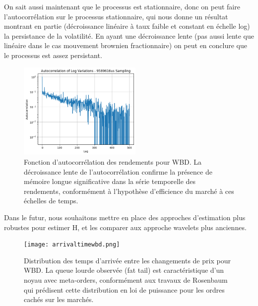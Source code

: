 \documentclass[10pt,a4paper]{article}
\theoremstyle{definition}
\theoremstyle{remark}
\begin{document}
\begin{itemize}
On sait aussi maintenant que le processus est stationnaire, donc on peut faire l'autocorrélation sur le processus stationnaire, qui nous donne un résultat montrant en partie
(décroissance linéaire à taux faible et constant en échelle log) la persistance de la volatilité. En ayant une décroissance lente (pas aussi lente que linéaire dans le cas mouvement brownien fractionnaire)
on peut en conclure que le processus est assez persistant.

\begin{figure}[h!]
    \centering
        \includegraphics[width=0.53\textwidth]{autocorr.png}
    \caption{Fonction d'autocorrélation des rendements pour WBD. La décroissance lente de l'autocorrélation confirme la présence de mémoire longue significative dans la série temporelle des rendements, conformément à l'hypothèse d'efficience du marché à ces échelles de temps.}
    \label{fig:autocorr_wbd}
\end{figure}



Dans le futur, nous souhaitons mettre en place des approches d'estimation plus robustes \cite{chong2024minimax, chong2024clt} pour estimer H, et les comparer aux approche wavelets plus anciennes. 

\begin{figure}[h!]
    \centering
        \texttt{[image: arrivaltimewbd.png]}
    \caption{Distribution des temps d'arrivée entre les changements de prix pour WBD. La queue lourde observée (fat tail) est caractéristique d'un noyau avec meta-orders, conformément aux travaux de Rosenbaum qui prédisent cette distribution en loi de puissance pour les ordres cachés sur les marchés.}
    \label{fig:arrival_times_wbd}
\end{figure}


\end{itemize}
\end{document}
